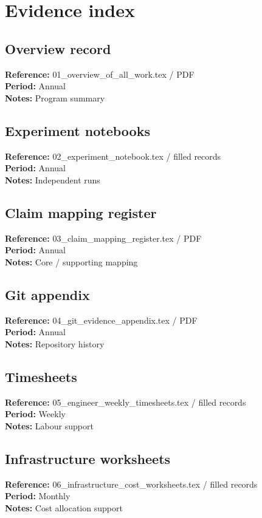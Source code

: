\documentclass[11pt]{article}
\begin{document}
\section{Evidence index}

\subsection*{Overview record}
\textbf{Reference:} 01\_overview\_of\_all\_work.tex / PDF \\
\textbf{Period:} Annual \\
\textbf{Notes:} Program summary

\subsection*{Experiment notebooks}
\textbf{Reference:} 02\_experiment\_notebook.tex / filled records \\
\textbf{Period:} Annual \\
\textbf{Notes:} Independent runs

\subsection*{Claim mapping register}
\textbf{Reference:} 03\_claim\_mapping\_register.tex / PDF \\
\textbf{Period:} Annual \\
\textbf{Notes:} Core / supporting mapping

\subsection*{Git appendix}
\textbf{Reference:} 04\_git\_evidence\_appendix.tex / PDF \\
\textbf{Period:} Annual \\
\textbf{Notes:} Repository history

\subsection*{Timesheets}
\textbf{Reference:} 05\_engineer\_weekly\_timesheets.tex / filled records \\
\textbf{Period:} Weekly \\
\textbf{Notes:} Labour support

\subsection*{Infrastructure worksheets}
\textbf{Reference:} 06\_infrastructure\_cost\_worksheets.tex / filled records \\
\textbf{Period:} Monthly \\
\textbf{Notes:} Cost allocation support
\end{document}
